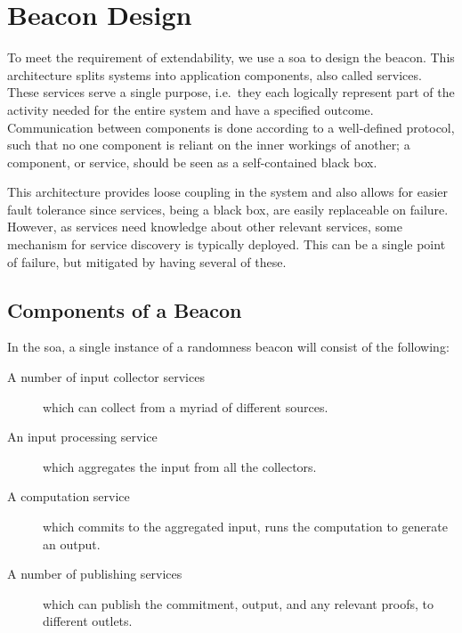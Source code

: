 \section{Beacon Design}


To meet the requirement of extendability, we use a \gls{soa} to design the beacon.
This architecture splits systems into application components, also called services.
These services serve a single purpose, i.e.\ they each logically represent part of the activity needed for the entire system and have a specified outcome.
Communication between components is done according to a well-defined protocol, such that no one component is reliant on the inner workings of another;
a component, or service, should be seen as a self-contained black box.

This architecture provides loose coupling in the system and also allows for easier fault tolerance since services, being a black box, are easily replaceable on failure.
However, as services need knowledge about other relevant services, some mechanism for service discovery is typically deployed.
This can be a single point of failure, but mitigated by having several of these. 

\subsection{Components of a Beacon}
\label{sub:components_of_a_beacon}
In the \gls{soa}, a single instance of a randomness beacon will consist of the following:
\begin{description}
    \item[A number of input collector services] which can collect from a myriad of different sources.
    \item[An input processing service] which aggregates the input from all the collectors.
    \item[A computation service] which commits to the aggregated input, runs the computation to generate an output.
    \item[A number of publishing services] which can publish the commitment, output, and any relevant proofs, to different outlets.
\end{description}

